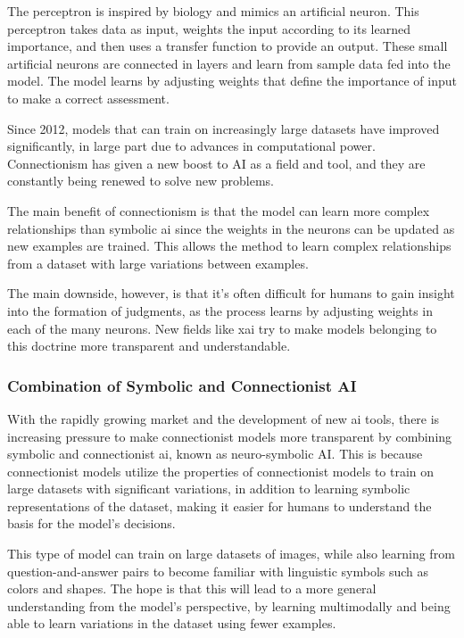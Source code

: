 The perceptron is inspired by biology and mimics an artificial neuron. This perceptron takes data as input, weights the input according to its learned importance, and then uses a transfer function to provide an output. These small artificial neurons are connected in layers and learn from sample data fed into the model. The model learns by adjusting weights that define the importance of input to make a correct assessment.

Since 2012, models that can train on increasingly large datasets have improved significantly, in large part due to advances in computational power. Connectionism has given a new boost to AI as a field and tool, and they are constantly being renewed to solve new problems.

The main benefit of connectionism is that the model can learn more complex relationships than symbolic \gls{ai} since the weights in the neurons can be updated as new examples are trained. This allows the method to learn complex relationships from a dataset with large variations between examples.

The main downside, however, is that it's often difficult for humans to gain insight into the formation of judgments, as the process learns by adjusting weights in each of the many neurons. New fields like \gls{xai} try to make models belonging to this doctrine more transparent and understandable.


\subsubsection{Combination of Symbolic and Connectionist AI}
With the rapidly growing market and the development of new \gls{ai} tools, there is increasing pressure to make connectionist models more transparent by combining symbolic and connectionist \gls{ai}, known as neuro-symbolic AI. This is because connectionist models utilize the properties of connectionist models to train on large datasets with significant variations, in addition to learning symbolic representations of the dataset, making it easier for humans to understand the basis for the model's decisions.

This type of model can train on large datasets of images, while also learning from question-and-answer pairs to become familiar with linguistic symbols such as colors and shapes. The hope is that this will lead to a more general understanding from the model's perspective, by learning multimodally and being able to learn variations in the dataset using fewer examples.

